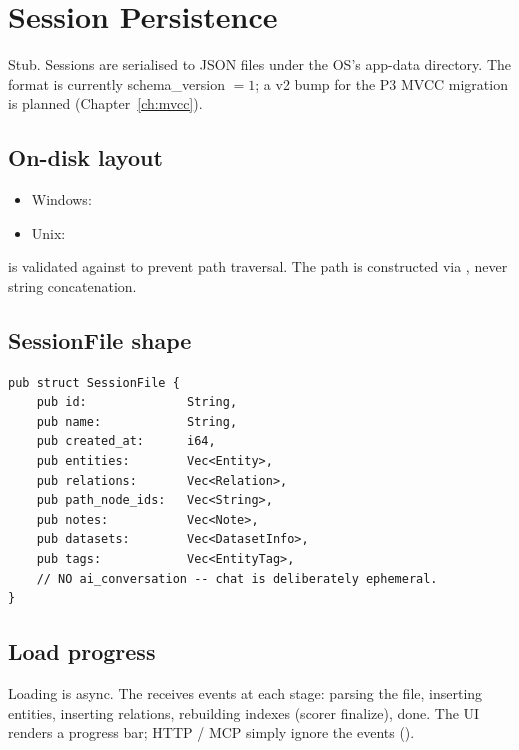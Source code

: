 \chapter{Session Persistence}
\label{ch:persistence}

\begin{note}
Stub. Sessions are serialised to JSON files under the OS's
app-data directory. The format is currently schema\_version $= 1$;
a v2 bump for the P3 MVCC migration is planned
(Chapter~\ref{ch:mvcc}).
\end{note}

\section{On-disk layout}

\begin{itemize}
    \item Windows: 
    \item Unix: 
\end{itemize}

 is validated against  to
prevent path traversal. The path is constructed via
, never string concatenation.

\section{SessionFile shape}

\begin{lstlisting}[style=rust]
pub struct SessionFile {
    pub id:              String,
    pub name:            String,
    pub created_at:      i64,
    pub entities:        Vec<Entity>,
    pub relations:       Vec<Relation>,
    pub path_node_ids:   Vec<String>,
    pub notes:           Vec<Note>,
    pub datasets:        Vec<DatasetInfo>,
    pub tags:            Vec<EntityTag>,
    // NO ai_conversation -- chat is deliberately ephemeral.
}
\end{lstlisting}

\section{Load progress}

Loading is async. The  receives
 events at each stage: parsing the
file, inserting entities, inserting relations, rebuilding indexes
(scorer finalize), done. The UI renders a progress bar; HTTP / MCP
simply ignore the events ().

